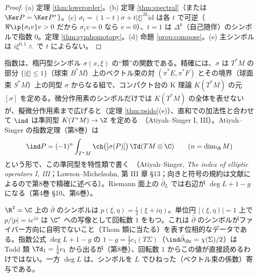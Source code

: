 \begin{proof}
(a) 定理 \ref{thm:lowerorder}。(b) 定理 \ref{thm:spectral}（または $\Ker P=\Ker P^*$）。(c) $\sigma_t=(1-t)\sigma+t|\xi|^{2k}\mathrm{id}$ は各 $t$ で可逆（$\Re\ip{\sigma_tv}v>0$ だから $\sigma_tv=0$ なら $v=0$）、$t=1$ は $\Delta^k$（自己随伴）のシンボルで指数 $0$。定理 \ref{thm:symhomotopy}。(d) 命題 \ref{prop:compose}。(e) 主シンボルは $i\xi^{0,1}\wedge$ で $t$ によらない。
\end{proof}
\begin{rem}[位相的な量としての指数]
指数は、楕円型シンボル $\sigma(x,\xi)$ の``類''の関数である。精確には、$\sigma$ は $T^*M$ の部分 $\{|\xi|\le1\}$（球束 $B^*M$）上のベクトル束の対 $(\pi^*E,\pi^*F)$ とその境界（球面束 $S^*M$）上の同型 $\sigma$ からなる組で、コンパクト台の K 理論 $K(T^*M)$ の元 $[\sigma]$ を定める。微分作用素のシンボルだけでは $K(T^*M)$ の全体を表せないが、擬微分作用素まで広げると（定理 \ref{thm:psido}(e)）、直和での加法性と合わせて $\ind$ は準同型 $K(T^*M)\to\Z$ を定める\tC\ （Atiyah--Singer I, III）。Atiyah--Singer の指数定理（第8巻）は
\[
\ind P=(-1)^n\int_{T^*M}\ch\bigl([\sigma(P)]\bigr)\,\Td(TM\otimes\C)\qquad(n=\dim_{\R}M)
\]
という形で、この準同型を特性類で書く\tC\ （Atiyah--Singer, \emph{The index of elliptic operators I, III}；Lawson--Michelsohn, 第 III 章 \S13；向きと符号の規約は文献によるので第8巻で精確に述べる\tQ）。Riemann 面上の $\bar\partial_L$ では右辺が $\deg L+1-g$ になる（第4巻 \S10、第6巻）。
\end{rem}
\begin{ex}\label{ex:windsymbol}
$\R^2=\C$ 上の $\bar\partial$ のシンボルは $p(\xi,\eta)=\frac i2(\xi+i\eta)$。単位円 $|(\xi,\eta)|=1$ 上で $p/|p|=ie^{i\phi}$ は $\C^*$ への写像として回転数 $1$ をもつ。これは $\bar\partial$ のシンボルがファイバー方向に自明でないこと（Thom 類に当たる）を表す位相的なデータである。指数公式 $\deg L+1-g$ の $1-g=\frac12c_1(T\Sigma)$（$\ind\bar\partial_{\Oc}=\chi(\Sigma)/2$）は Todd 類 $\Td_1=\frac12c_1$ から出るが（第8巻）、回転数 $1$ からこの値が直接読めるわけではない。一方 $\deg L$ は、シンボルを $L$ でひねった（ベクトル束の係数）寄与である。
\begin{center}
\end{center}
\end{ex}
